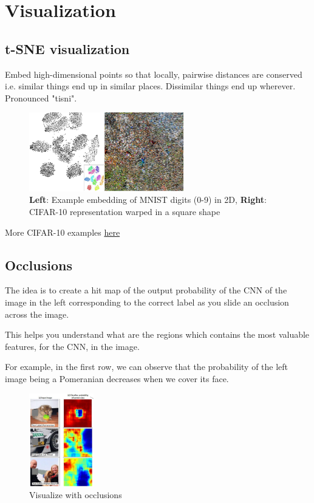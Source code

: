 \chapter{Visualization}

\section{t-SNE visualization}
Embed high-dimensional points so that locally, pairwise distances are conserved i.e. similar things end up in similar places.
Dissimilar things end up wherever. Pronounced "tisni".

\begin{figure}[h]
  \centering
  \includegraphics[width=0.6\textwidth]{Images/visualization/16.png}
  \caption{\textbf{Left}: Example embedding of MNIST digits (0-9) in 2D, \textbf{Right}: CIFAR-10 representation warped in a square shape}
\end{figure}

More CIFAR-10 examples \href{http://cs.stanford.edu/people/karpathy/cnnembed/}{here}

\section{Occlusions}
The idea is to create a hit map of the output probability of the CNN of the image in the left corresponding to the correct label as you slide an occlusion across the image.

This helps you understand what are the regions which contains the most valuable features, for the CNN, in the image.

For example, in the first row, we can observe that the probability of the left image being a Pomeranian decreases when we cover its face.

\begin{figure}[h]
  \centering
  \includegraphics[width=0.25\textwidth]{Images/visualization/3.png}
  \caption{Visualize with occlusions}
\end{figure}


